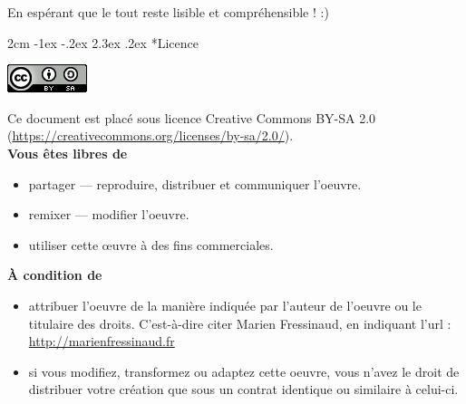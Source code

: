 \documentclass[a4paper,11pt]{article}
\makeatletter
\renewcommand\section{\@startsection{section}{1}{\z@}%
	{2cm \@plus -1ex \@minus -.2ex}%
	{2.3ex \@plus.2ex}%
	{\color{bleuClair}\reset@font\Large\bfseries}}
\makeatother
\begin{document}
En espérant que le tout reste lisible et compréhensible ! :)

\newpage
\section*{Licence}
  \begin{center}
    \includegraphics{ccby-sa.png}\\
  \end{center}
  Ce document est placé sous licence Creative Commons BY-SA 2.0 (\url{https://creativecommons.org/licenses/by-sa/2.0/}).\\
  \textbf{Vous êtes libres de}
  \begin{itemize}
    \item partager — reproduire, distribuer et communiquer l'oeuvre.
    \item remixer — modifier l'oeuvre.
    \item utiliser cette œuvre à des fins commerciales.
  \end{itemize}
  \textbf{À condition de}
  \begin{itemize}
    \item attribuer l'oeuvre de la manière indiquée par l'auteur de l'oeuvre ou le titulaire des droits. C'est-à-dire citer Marien Fressinaud, en indiquant l'url : \url{http://marienfressinaud.fr}
    \item si vous modifiez, transformez ou adaptez cette oeuvre, vous n'avez le droit de distribuer votre création que sous un contrat identique ou similaire à celui-ci.
  \end{itemize}
\end{document}
